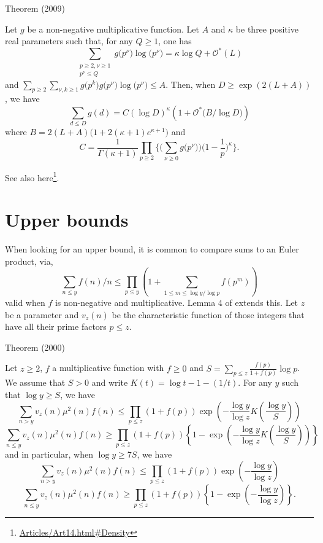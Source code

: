 \par 
\begin{thm}{Theorem (2009)}

Let $g$ be a non-negative multiplicative function.
Let $A$ and $\kappa$ be three positive real parameters such that, for any
$Q\ge1$, one has
$$
\sum_{\substack{ p\ge2, \nu\ge1\\  p^{\nu}\le Q}}
g\bigl(p^{\nu}\bigr)\log\bigl(p^{\nu}\bigr)
=
\kappa\log Q+\mathcal{O}^*(L)
$$
and
$
\sum_{p\ge2}
\sum_{\nu,k\ge1}g\bigl(p^k\bigr)g\bigl(p^{\nu}\bigr)\log\bigl(p^{\nu}\bigr)
\le A.
$
Then, when $D\ge\exp(2(L+A))$, we have
$$
\sum_{d\le D}g(d)= C\left(\log D\right)^{\kappa}
\left(1+\mathcal{O}^*\bigl(B/\log D\bigr)\right)
$$
where $B=2(L+A)\bigl(1+2(\kappa+1)e^{\kappa+1}\bigr)$ and
$$
C=\frac{1}{\Gamma(\kappa+1)}
\prod_{p\ge2}\biggl\{
\biggl(\sum_{\nu\ge0}g\bigl(p^{\nu}\bigr)\biggr)
\biggl(1-\frac1p\biggr)^{\kappa}\biggr\}.
$$
\end{thm}

See also here\footnote{\url{Articles/Art14.html#Density}}.

\section{Upper bounds}


When looking for an upper bound, it is common to compare sums to an Euler
product, via, 
$$
\sum_{n\le y}f(n)/n\le \prod_{p\le y}
\left(1+\sum_{1\le m\le \log y/\log p}f(p^m)\right)
$$
valid when $f$ is non-negative and multiplicative.
Lemma 4 of
\cite{Daboussi-Rivat*01}
extends this. Let $z$ be a parameter and $v_z(n)$ be the characteristic
function of those integers that have all their prime factors $p\le z$.

\begin{thm}{Theorem (2000)}

Let $z\ge2$, $f$ a multiplicative function with $f\ge0$ and 
$S=\sum_{p\le z}\frac{f(p)}{1+f(p)}\log p$. We assume that $S>0$ and write
$K(t)=\log t-1-(1/t)$. For any $y$ such that $\log y\ge S$, we have
$$
\sum_{n > y}v_z(n)\mu^2(n)f(n)
\le \prod_{p\le z}(1+f(p))\exp\left(-\frac{\log y}{\log z}
K\left(\frac{\log y}{S}\right)\right)
$$
$$
\sum_{n \le y}v_z(n)\mu^2(n)f(n)
\ge \prod_{p\le z}(1+f(p))\left\{1-\exp\left(-\frac{\log y}{\log z}
K\left(\frac{\log y}{S}\right)\right)\right\}
$$
and in particular, when $\log y\ge 7S$, we have
$$
\sum_{n > y}v_z(n)\mu^2(n)f(n)
\le \prod_{p\le z}(1+f(p))\exp\left(-\frac{\log y}{\log z}\right)
$$
$$
\sum_{n \le y}v_z(n)\mu^2(n)f(n)
\ge \prod_{p\le z}(1+f(p))\left\{1-\exp\left(-\frac{\log y}{\log z}\right)\right\}.
$$
\end{thm}


